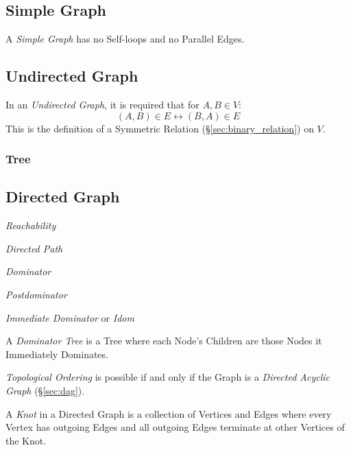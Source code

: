 \subsection{Simple Graph} \label{sec:simple_graph}

A \emph{Simple Graph} has no Self-loops and no Parallel Edges.



\subsection{Undirected Graph} \label{sec:undirected_graph}

In an \emph{Undirected Graph}, it is required that for $A,B \in V$:
\[
    (A,B) \in E \leftrightarrow (B,A) \in E
\]
This is the definition of a Symmetric Relation
(\S\ref{sec:binary_relation}) on $V$.



\subsubsection{Tree}\label{sec:graph_tree}



\subsection{Directed Graph} \label{sec:directed_graph}

\emph{Reachability}

\emph{Directed Path}

\emph{Dominator}

\emph{Postdominator}

\emph{Immediate Dominator} or \emph{Idom}

A \emph{Dominator Tree} is a Tree where each Node's Children are those
Nodes it Immediately Dominates.

\emph{Topological Ordering} is possible if and only if the Graph is a
\emph{Directed Acyclic Graph} (\S\ref{sec:dag}).

A \emph{Knot} in a Directed Graph is a collection of Vertices and
Edges where every Vertex has outgoing Edges and all outgoing Edges
terminate at other Vertices of the Knot.



